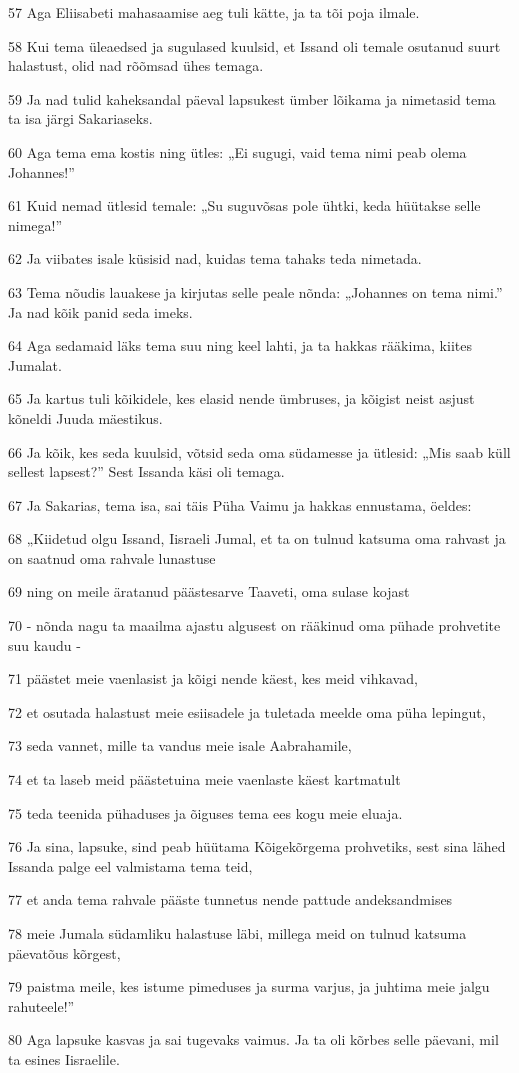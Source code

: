 \par 57 Aga Eliisabeti mahasaamise aeg tuli kätte, ja ta tõi poja ilmale.
\par 58 Kui tema üleaedsed ja sugulased kuulsid, et Issand oli temale osutanud suurt halastust, olid nad rõõmsad ühes temaga.
\par 59 Ja nad tulid kaheksandal päeval lapsukest ümber lõikama ja nimetasid tema ta isa järgi Sakariaseks.
\par 60 Aga tema ema kostis ning ütles: „Ei sugugi, vaid tema nimi peab olema Johannes!”
\par 61 Kuid nemad ütlesid temale: „Su suguvõsas pole ühtki, keda hüütakse selle nimega!”
\par 62 Ja viibates isale küsisid nad, kuidas tema tahaks teda nimetada.
\par 63 Tema nõudis lauakese ja kirjutas selle peale nõnda: „Johannes on tema nimi.” Ja nad kõik panid seda imeks.
\par 64 Aga sedamaid läks tema suu ning keel lahti, ja ta hakkas rääkima, kiites Jumalat.
\par 65 Ja kartus tuli kõikidele, kes elasid nende ümbruses, ja kõigist neist asjust kõneldi Juuda mäestikus.
\par 66 Ja kõik, kes seda kuulsid, võtsid seda oma südamesse ja ütlesid: „Mis saab küll sellest lapsest?” Sest Issanda käsi oli temaga.
\par 67 Ja Sakarias, tema isa, sai täis Püha Vaimu ja hakkas ennustama, öeldes:
\par 68 „Kiidetud olgu Issand, Iisraeli Jumal, et ta on tulnud katsuma oma rahvast ja on saatnud oma rahvale lunastuse
\par 69 ning on meile äratanud päästesarve Taaveti, oma sulase kojast
\par 70 - nõnda nagu ta maailma ajastu algusest on rääkinud oma pühade prohvetite suu kaudu -
\par 71 päästet meie vaenlasist ja kõigi nende käest, kes meid vihkavad,
\par 72 et osutada halastust meie esiisadele ja tuletada meelde oma püha lepingut,
\par 73 seda vannet, mille ta vandus meie isale Aabrahamile,
\par 74 et ta laseb meid päästetuina meie vaenlaste käest kartmatult
\par 75 teda teenida pühaduses ja õiguses tema ees kogu meie eluaja.
\par 76 Ja sina, lapsuke, sind peab hüütama Kõigekõrgema prohvetiks, sest sina lähed Issanda palge eel valmistama tema teid,
\par 77 et anda tema rahvale pääste tunnetus nende pattude andeksandmises
\par 78 meie Jumala südamliku halastuse läbi, millega meid on tulnud katsuma päevatõus kõrgest,
\par 79 paistma meile, kes istume pimeduses ja surma varjus, ja juhtima meie jalgu rahuteele!”
\par 80 Aga lapsuke kasvas ja sai tugevaks vaimus. Ja ta oli kõrbes selle päevani, mil ta esines Iisraelile.


